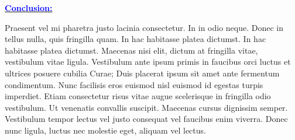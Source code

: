 \documentclass{article}
\newcommand{\statement}[1]{\par\medskip
  \underline{\textcolor{blue}{\textbf{#1:}}}\space
}
\begin{document}
\statement{Conclusion}
Praesent vel mi pharetra justo lacinia consectetur. In in odio neque.
Donec in tellus nulla, quis fringilla quam. In hac habitasse platea
dictumst. In hac habitasse platea dictumst. Maecenas nisi elit, dictum
at fringilla vitae, vestibulum vitae ligula. Vestibulum ante ipsum
primis in faucibus orci luctus et ultrices posuere cubilia Curae; Duis
placerat ipsum sit amet ante fermentum condimentum. Nunc facilisis
eros euismod nisl euismod id egestas turpis imperdiet. Etiam
consectetur risus vitae augue scelerisque in fringilla odio
vestibulum. Ut venenatis convallis suscipit. Maecenas cursus dignissim
semper. Vestibulum tempor lectus vel justo consequat vel faucibus enim
viverra. Donec nunc ligula, luctus nec molestie eget, aliquam vel
lectus.
\end{document}
